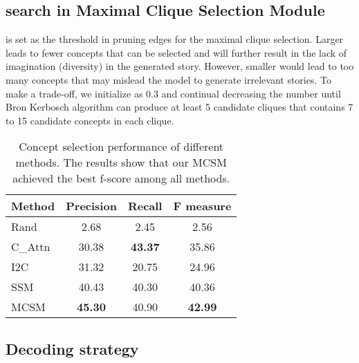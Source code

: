 \subsection{ search in Maximal Clique Selection Module}
  is set as the threshold in pruning edges for the maximal clique selection. Larger  leads to fewer concepts that can be selected and will further result in the lack of imagination (diversity) in the generated story. However, smaller  would lead to too many concepts that may mislead the model to generate irrelevant stories. To make a trade-off, we initialize  as 0.3 and continual decreasing the number until Bron Kerbosch algorithm \cite{10.1145/362342.362367} can produce at least 5 candidate cliques that contains 7 to 15 candidate concepts in each clique.
 


\begin{table}[t]
\centering
\begin{tabular}{l|c|c|c}
\hline
 Method&  Precision& Recall&  F measure \\\hline\hline
 Rand&  2.68&  2.45&  2.56 \\\hline
 C\_Attn&  30.38&  \textbf{43.37}&  35.86 \\\hline
 I2C&  31.32&  20.75&  24.96\\\hline
 SSM&  40.43&  40.30&  40.36\\\hline
 MCSM&  \textbf{45.30}&  40.90&  \textbf{42.99}\\
  \hline
\end{tabular}
\caption{Concept selection performance of different methods. The results show that our MCSM achieved the best f-score among all methods.}
\label{tab:acc}
\end{table}









\subsection{Decoding strategy}

